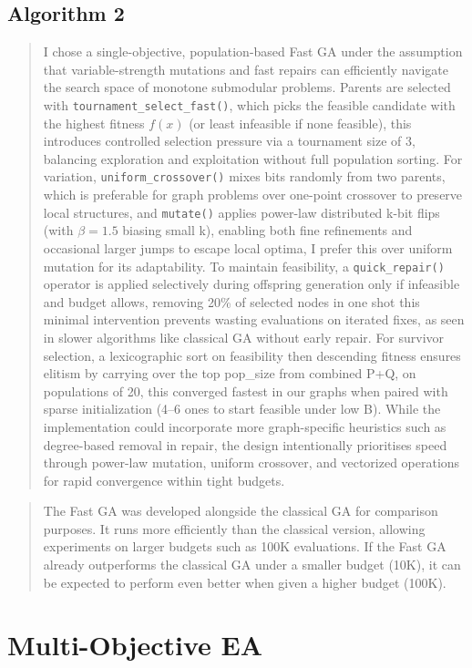 \documentclass[11pt]{article}
\begin{document}
    \subsection{Algorithm 2}
    \begin{quote}
        \qquad I chose a single-objective, population-based Fast GA under the assumption that variable-strength mutations and fast repairs can efficiently navigate the search space of monotone submodular problems. Parents are selected with \texttt{tournament\_select\_fast()}, which picks the feasible candidate with the highest fitness \(f(x)\) (or least infeasible if none feasible), this introduces controlled selection pressure via a tournament size of 3, balancing exploration and exploitation without full population sorting. For variation, \texttt{uniform\_crossover()} mixes bits randomly from two parents, which is preferable for graph problems over one-point crossover to preserve local structures, and \texttt{mutate()} applies power-law distributed k-bit flips (with \(\beta=1.5\) biasing small k), enabling both fine refinements and occasional larger jumps to escape local optima, I prefer this over uniform mutation for its adaptability. To maintain feasibility, a \texttt{quick\_repair()} operator is applied selectively during offspring generation only if infeasible and budget allows, removing 20\% of selected nodes in one shot this minimal intervention prevents wasting evaluations on iterated fixes, as seen in slower algorithms like classical GA without early repair. For survivor selection, a lexicographic sort on feasibility then descending fitness ensures elitism by carrying over the top pop\_size from combined P+Q, on populations of 20, this converged fastest in our graphs when paired with sparse initialization (4--6 ones to start feasible under low B). While the implementation could incorporate more graph-specific heuristics such as degree-based removal in repair, the design intentionally prioritises speed through power-law mutation, uniform crossover, and vectorized operations for rapid convergence within tight budgets.
    \end{quote}
    \begin{quote}
        \qquad The Fast GA was developed alongside the classical GA for comparison purposes. It runs more efficiently than the classical version, allowing experiments on larger budgets such as 100K evaluations. If the Fast GA already outperforms the classical GA under a smaller budget (10K), it can be expected to perform even better when given a higher budget (100K).
    \end{quote}

    \section{Multi-Objective EA}
    
\end{document}
